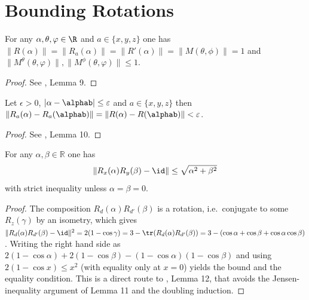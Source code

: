 \chapter{Bounding Rotations}

\begin{lemma} \label{lem:RaRalpha}
\leanok
For any $\alpha, \theta,\varphi \in \R$ and $a \in \{x,y,z\}$ one has $\| R(\alpha)\| = \| R_a(\alpha)\| = \| R'(\alpha) \| =\| M(\theta, \phi)\| = 1$ and $\| M^\theta(\theta,\varphi)\|, \| M^\phi(\theta,\varphi)\| \leq 1$.
\end{lemma}
\begin{proof}
\leanok
See \cite{polyhedron.without.rupert}, Lemma 9.
\end{proof}

\begin{lemma} \label{lem:RaRa}
  \leanok
Let $\epsilon>0$, $|\alpha-\alphab|\leq\varepsilon$ and $a \in \{x,y,z\}$ then
$\|R_a(\alpha)-R_a({\alphab})\|=\|R(\alpha)-R(\alphab)\| < \varepsilon$.
\end{lemma}
\begin{proof}
\leanok
See \cite{polyhedron.without.rupert}, Lemma 10.
\end{proof}



\begin{lemma} \label{lem:RxRy}
\leanok
For any $\alpha,\beta\in \mathbb{R}$ one has
\[
    \|R_x(\alpha)R_y(\beta)-\id\| \leq  \sqrt{\alpha^2+\beta^2}
\]
with strict inequality unless $\alpha = \beta = 0$.
\end{lemma}

\begin{proof}
\leanok
The composition $R_d(\alpha)R_{d'}(\beta)$ is a rotation, i.e.\ conjugate
to some $R_z(\gamma)$ by an isometry, which gives
$\|R_d(\alpha)R_{d'}(\beta)-\id\|^2 = 2(1-\cos\gamma)
= 3 - \tr(R_d(\alpha)R_{d'}(\beta))
= 3 - (\cos\alpha + \cos\beta + \cos\alpha\cos\beta)$.
Writing the right hand side as
$2(1-\cos\alpha) + 2(1-\cos\beta) - (1-\cos\alpha)(1-\cos\beta)$
and using $2(1-\cos x) \leq x^2$ (with equality only at $x = 0$)
yields the bound and the equality condition.
This is a direct route to \cite{polyhedron.without.rupert}, Lemma 12,
that avoids the Jensen-inequality argument of Lemma 11 and the
doubling induction.
\end{proof}

